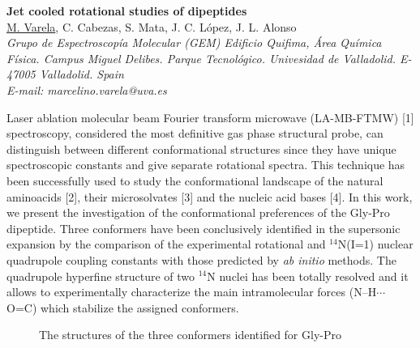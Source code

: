 \newpage
\setcounter{figure}{0}
\begin{center}
{\bf \Large
Jet cooled rotational studies of dipeptides
}
\\
\vspace{0.5cm}
\underline{M. Varela}, C. Cabezas, S. Mata, J. C. López, J. L. Alonso
\\
\vspace{0.5cm}
{\it
Grupo de Espectroscopía Molecular (GEM) Edificio Quifima, Área Química Física. Campus Miguel
Delibes. Parque Tecnológico. Univesidad de Valladolid. E-47005
Valladolid. Spain
}
\\
\vspace{0.5cm}
{\it E-mail: marcelino.varela@uva.es}
\\
\vspace{0.5cm}
\end{center}
Laser ablation molecular beam Fourier transform microwave (LA-MB-FTMW) [1]
spectroscopy, considered the most definitive gas phase structural probe, can
distinguish between different conformational structures since they have unique
spectroscopic constants and give separate rotational spectra. This technique has been
successfully used to study the conformational landscape of the natural aminoacids
[2], their microsolvates [3] and the nucleic acid bases [4]. In this work, we present
the investigation of the conformational preferences of the Gly-Pro dipeptide. Three
conformers have been conclusively identified in the supersonic expansion by the
comparison of the experimental rotational and $^{14}$N(I=1) nuclear quadrupole coupling
constants with those predicted by \textit{ab initio} methods. The quadrupole hyperfine
structure of two $^{14}$N nuclei has been totally resolved and it allows to experimentally
characterize the main intramolecular forces (N--H$\cdots$O=C) which stabilize the assigned
conformers.
\\
\begin{figure}[h]
{}
{}
{}
 \caption[]{The structures of the three conformers identified for Gly-Pro}
\end{figure}
\\
